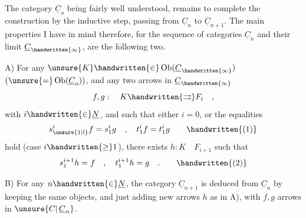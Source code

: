  The category $\underline{C}_o$ being fairly well understood, remains to complete the construction by the inductive step, passing from $\underline{C}_n$ to $\underline{C}_{n+1}$. The main properties I have in mind therefore, for the sequence of categories $\underline{C}_n$ and their limit $\underline{C}_{\handwritten{\infty}}$, are the following two.

A) For any $\unsure{K}\handwritten{\in}\operatorname{Ob}(\underline{C}_{\handwritten{\infty}})$ $(\unsure{=}\operatorname{Ob}(\underline{C}_o))$, and any two arrows in $\underline{C}_{\handwritten{\infty}}$
\[
 f,g: \quad K\handwritten{\rightrightarrows}F_i\quad ,
\]
with $i\handwritten{\in}\underline{N}$\deleted{\unsure{,}}, and such that either $i=0$, or the equalities
\[
 s_{\unsure{1|l}}^i f=s_1^i g \quad , \quad t_1^i f=t_1^i g \tag*{\handwritten{(1)}}
\]
hold (case $i\handwritten{\geq}1$), there exists $h:K\quad F_{i+1}$ such that
\[
 s_1^{i+1}h=f\quad ,\quad t_1^{i+1}h=g\quad . \tag*{\handwritten{(2)}}
\]

B) For any $n\handwritten{\in}\underline{N}$, the category $\underline{C}_{n+1}$ is deduced from $\underline{C}_n$ by keeping the same objects, and just adding new arrows  $h$ as in A), with $f,g$ arrows in $\unsure{C|\,\underline{C}_n}$.

